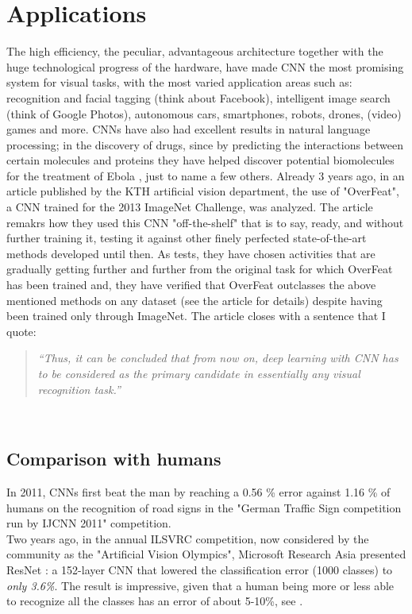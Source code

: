 \section{Applications}The high efficiency, the peculiar, advantageous architecture together with the huge technological progress of the hardware, have made CNN the most promising system for visual tasks, with the most varied application areas such as: recognition and facial tagging (think about Facebook), intelligent image search (think of Google Photos), autonomous cars, smartphones, robots, drones, (video) games and more. CNNs have also had excellent results in natural language processing; in the discovery of drugs, since by predicting the interactions between certain molecules and proteins they have helped discover potential biomolecules for the treatment of Ebola \parencite{WCNN}, just to name a few others. Already 3 years ago, in an article published by the KTH \parencite{Overfeat} artificial vision department, the use of "OverFeat", a CNN trained for the 2013 ImageNet Challenge, was analyzed. The article remakrs how they used this CNN "off-the-shelf" that is to say, ready, and without further training it, testing it against other finely perfected state-of-the-art methods developed until then. As tests, they have chosen activities that are gradually getting further and further from the original task for which OverFeat has been trained and, they have verified that OverFeat outclasses the above mentioned methods on any dataset (see the article for details) despite having been trained only through ImageNet. The article closes with a sentence that I quote:
\begin{quote}
\emph{“Thus, it can be concluded that from now on, deep learning with CNN has to be considered as the primary candidate in essentially any visual recognition task.”}
\end{quote}\\
\subsection{Comparison with humans}In 2011, CNNs first beat the man by reaching a 0.56 \% error against 1.16 \% of humans on the recognition of road signs in the "German Traffic Sign competition run by IJCNN 2011" competition.\\

Two years ago, in the annual ILSVRC competition, now considered by the community as the "Artificial Vision Olympics", Microsoft Research Asia presented ResNet \parencite{resnet}: a 152-layer CNN that lowered the classification error (1000 classes) to \emph{only 3.6\%}. The result is impressive, given that a human being more or less able to recognize all the classes has an error of about 5-10\%, see \parencite{Wkarpa}. 
\\

